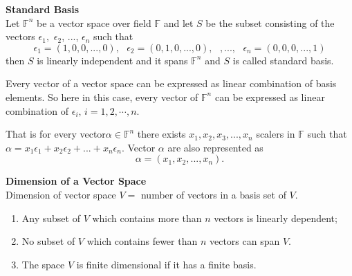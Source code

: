 \documentclass[12pt]{report}
\def\F{{\mathbb F}}
\begin{document}
\begin{defn}
\textbf{Standard Basis}\\
Let $\F^n$ be a vector space over field $\F$   and let $S$ be the subset consisting of the vectors $\epsilon_1,$ $\epsilon_2$, ..., $\epsilon_n$ such that
\begin{equation*}
\epsilon_1=(1,0,0,...,0), \text{ }\epsilon_2=(0,1,0,...,0),\text{ },..., \text{ }\epsilon_n=(0,0,0,...,1)
\end{equation*}
then $S$ is linearly independent and it spans $\F^n$ and $S$ is called standard basis.

Every vector of a vector space can be expressed as linear combination of basis elements. So here in this case, every vector of $\F^n$ can be expressed as linear combination of $\epsilon_i, \, i=1,2,\cdots,n$. 

That is for every vector$\alpha \in \F^n$ there exists $x_1,x_2,x_3,...,x_n$  scalers in $\F$ such that  $\alpha = x_1\epsilon_1+x_2\epsilon_2+...+x_n\epsilon_n.$ 
Vector $\alpha$ are also represented as 
\begin{equation}
\alpha = (x_1,x_2,...,x_n).
\end{equation}
\end{defn}
\begin{defn}
\textbf{Dimension of a Vector Space}\\
Dimension of vector space $V=$ number of vectors in a basis set of $V$.

 
\begin{enumerate}
	\item Any subset of $V$ which contains more than $n$ vectors is linearly dependent; 
	\item No subset of $V$ which contains fewer than $n$ vectors can span $V$.
	\item The space $V$ is finite dimensional if it has a finite basis.
\end{enumerate}

\end{defn}
\end{document}
